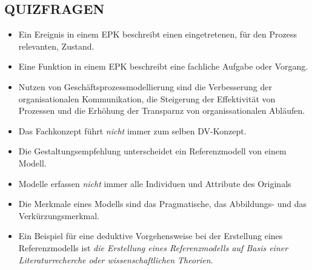 \documentclass[12pt,a4paper]{article}
\begin{document}
\subsection{QUIZFRAGEN} %
\begin{itemize}
   \item Ein Ereignis in einem EPK beschreibt einen eingetretenen, für den Prozess relevanten, Zustand.
   \item Eine Funktion in einem EPK beschreibt eine fachliche Aufgabe oder Vorgang.
   
   \item Nutzen von Geschäftsprozessmodellierung sind die Verbesserung der organisationalen Kommunikation, die Steigerung der Effektivität von Prozessen und die Erhöhung der Transparnz von organissationalen Abläufen.
   
   \item Das Fachkonzept führt \emph{nicht} immer zum selben DV-Konzept.
   
   \item Die Gestaltungsempfehlung unterscheidet ein Referenzmodell von einem Modell.
   \item Modelle erfassen \emph{nicht} immer alle Individuen und Attribute des Originals
   \item Die Merkmale eines Modells sind das Pragmatische, das Abbildungs- und das Verkürzungsmerkmal.
   
   \item Ein Beispiel für eine deduktive Vorgehensweise bei der Erstellung eines Referenzmodells ist \emph{die Erstellung eines Referenzmodells auf Basis einer Literaturrecherche oder wissenschaftlichen Theorien}.
\end{itemize}
\end{document}
